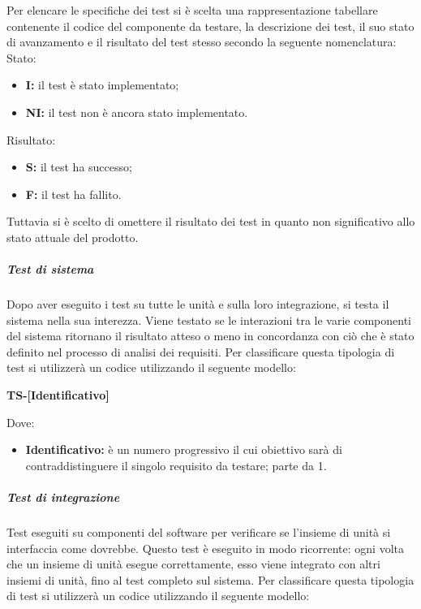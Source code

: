                 Per elencare le specifiche dei test si è scelta una rappresentazione tabellare contenente il codice del componente da testare, la descrizione dei test, il suo stato di avanzamento e il risultato del test stesso secondo la seguente nomenclatura: \\
                Stato:
                \begin{itemize}
                    \item \textbf{I:} il test è stato implementato;
                    \item \textbf{NI:} il test non è ancora stato implementato.     
                \end{itemize}
                Risultato:
                \begin{itemize}
                    \item \textbf{S:} il test ha successo;
                    \item \textbf{F:} il test ha fallito.
                \end{itemize}
                Tuttavia si è scelto di omettere il risultato dei test in quanto non significativo allo stato attuale del prodotto.


            \subparagraph*{Test di sistema}
                Dopo aver eseguito i test su tutte le unità e sulla loro integrazione, si testa il sistema nella sua interezza. Viene testato se le interazioni tra le varie componenti del sistema ritornano il risultato atteso o meno in concordanza con ciò che è stato definito nel processo di analisi dei requisiti.
                Per classificare questa tipologia di test si utilizzerà un codice utilizzando il seguente modello:     

                \begin{center}
                	\textbf{TS-[Identificativo]}
                \end{center}
                Dove: 
                
                \begin{itemize}
	                \item \textbf{Identificativo:} è un numero progressivo il cui obiettivo sarà di contraddistinguere il singolo requisito da testare; parte da 1.
                \end{itemize}

                 \subparagraph*{Test di integrazione}
        			Test eseguiti su componenti del software per verificare se l'insieme di unità si interfaccia come dovrebbe. Questo test è eseguito in modo ricorrente: ogni volta che un insieme di unità esegue correttamente, esso viene integrato con altri insiemi di unità, fino al test completo sul sistema.
                    Per classificare questa tipologia di test si utilizzerà un codice utilizzando il seguente modello:     

